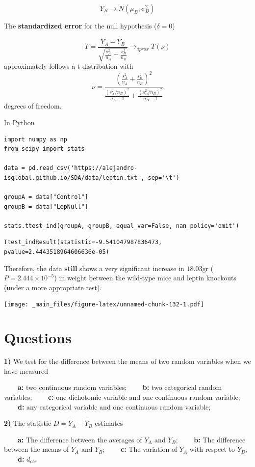 \documentclass[
]{book}
\begin{document}
\[Y_B \rightarrow N(\mu_B, \sigma_B^2)\]

The \textbf{standardized error} for the null hypothesis (\(\delta=0\))

\[T=\frac{\bar{Y}_A-\bar{Y}_B }{\sqrt{\frac{s_A^2}{n_A}+\frac{s_B^2}{n_B}}} \rightarrow_{aprox} T(\nu)\]
approximately follows a t-distribution with
\[\nu=\frac{(\frac{s_A^2}{n_A}+\frac{s_B^2}{n_B})^2}{\frac{(s_A^2/n_B)^2}{n_A-1}+\frac{(s_B^2/n_B)^2}{n_B-1}}\]
degrees of freedom.

In Python

\begin{verbatim}
import numpy as np
from scipy import stats

data = pd.read_csv('https://alejandro-isglobal.github.io/SDA/data/leptin.txt', sep='\t')

groupA = data["Control"]
groupB = data["LepNull"]

stats.ttest_ind(groupA, groupB, equal_var=False, nan_policy='omit')
\end{verbatim}

\begin{verbatim}
Ttest_indResult(statistic=-9.541047987836473, pvalue=2.4443518964606636e-05)
\end{verbatim}

Therefore, the data \textbf{still} shows a very significant increase in \(18.03\)gr (\(P=2.444 \times 10^{-5}\)) in weight between the wild-type mice and leptin knockouts (under a more appropriate test).

\texttt{[image: \_main\_files/figure-latex/unnamed-chunk-132-1.pdf]}

\hypertarget{questions-12}{%
\section{Questions}\label{questions-12}}

\textbf{1)} We test for the difference between the means of two random variables when we have measured

\textbf{\(\qquad\)a:} two continuous random variables;
\textbf{\(\qquad\)b:} two categorical random variables;
\textbf{\(\qquad\)c:} one dichotomic variable and one continuous random variable;
\textbf{\(\qquad\)d:} any categorical variable and one continuous random variable;

\textbf{2)} The statistic \(D=\bar{Y}_A-\bar{Y}_B\) estimates

\textbf{\(\qquad\)a:} The difference between the averages of \(Y_A\) and \(Y_B\);
\textbf{\(\qquad\)b:} The difference between the means of \(Y_A\) and \(Y_B\);
\textbf{\(\qquad\)c:} The variation of \(\bar{Y}_A\) with respect to \(\bar{Y}_B\);
\textbf{\(\qquad\)d:} \(d_{obs}\)
\end{document}
